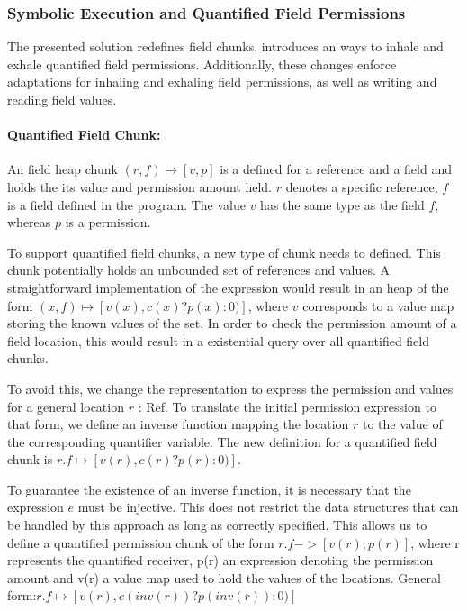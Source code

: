 \documentclass[12pt]{article}
\begin{document}
\subsubsection{Symbolic Execution and Quantified Field Permissions}

The presented solution redefines field chunks, introduces an ways to inhale and exhale quantified field permissions. Additionally, these changes enforce adaptations for inhaling and exhaling field permissions, as well as writing and reading field values.



\paragraph{Quantified Field Chunk:}
An field heap chunk \((r, f) \mapsto [v, p]\) is a defined for a reference and a field and holds the its value and permission amount held. \(r\) denotes a specific reference, \(f\) is a field defined in the program. The value \(v\) has the same type as the field \(f\), whereas \(p\) is a permission. 

To support quantified field chunks, a new type of chunk needs to defined. This chunk potentially holds an unbounded set of references and values. A straightforward implementation of the expression would result in an heap of the form  \((x, f) \mapsto [v(x), c(x) ? p(x) : 0)]\), where \(v\) corresponds to a value map storing the known values of the set. In order to check the permission amount of a field location, this would result in a existential query over all quantified field chunks.

To avoid this, we change the representation to express the permission and values for a general location \(r\) : Ref.  To translate the initial permission expression to that form, we define an inverse function mapping the location \(r\) to the value of the corresponding quantifier variable. The new definition for a quantified field chunk is \(r.f \mapsto [v(r), c(r) ? p(r) : 0)]\).

To guarantee the existence of an inverse function, it is necessary that the expression \(e\) must be injective. This does not restrict the data structures that can be handled by this approach as long as correctly specified. This allows us to define a quantified permission chunk of the form \(r.f -> [v(r), p(r)]\), where r represents the quantified receiver, p(r) an expression denoting the permission amount and v(r) a value map used to hold the values of the locations.
General form:\(r.f \mapsto [v(r), c(inv(r)) ? p(inv(r)) : 0)]\)
\end{document}
